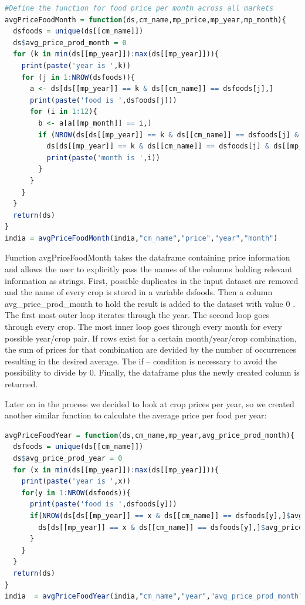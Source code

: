 \documentclass[11pt]{article}
\begin{document}
\begin{lstlisting}[language= R, captionpos=b,caption=\href{https://github.com/jaidikam/sps_ws1718/tree/master/Qfolder1}{SPL\_Q1\_india\_preparation}]
#Define the function for food price per month across all markets
avgPriceFoodMonth = function(ds,cm_name,mp_price,mp_year,mp_month){
  dsfoods = unique(ds[[cm_name]])
  ds$avg_price_prod_month = 0
  for (k in min(ds[[mp_year]]):max(ds[[mp_year]])){
    print(paste('year is ',k))
    for (j in 1:NROW(dsfoods)){
      a <- ds[ds[[mp_year]] == k & ds[[cm_name]] == dsfoods[j],]
      print(paste('food is ',dsfoods[j]))
      for (i in 1:12){
        b <- a[a[[mp_month]] == i,]
        if (NROW(ds[ds[[mp_year]] == k & ds[[cm_name]] == dsfoods[j] & ds[[mp_month]] == i,]$avg_price_prod_month) >0) {
          ds[ds[[mp_year]] == k & ds[[cm_name]] == dsfoods[j] & ds[[mp_month]] == i,]$avg_price_prod_month =  sum(b[[mp_price]])/ NROW(b)
          print(paste('month is ',i))  
        } 
      }
    }
  }
  return(ds)
}
india = avgPriceFoodMonth(india,"cm_name","price","year","month")
\end{lstlisting}

Function avgPriceFoodMonth takes the dataframe containing price information and allows the user to explicitly pass the names of the columns holding relevant information as strings.
First, possible duplicates in the input dataset are removed and the name of every crop is stored in a variable dsfoods. Then a column avg\_price\_prod\_month to hold the result is added to the dataset with value 0 .
The first most outer loop iterates through the year. The second loop goes through every crop. The most inner loop goes through every month for every possible year/crop pair. If rows exist for a certain month/year/crop combination, the sum of prices for that combination are devided by the number of occurrences resulting in the desired average. The if – condition is necessary to avoid the possibility to divide by 0. Finally, the dataframe plus the newly created column is returned.

Later on in the process we decided to look at crop prices per year, so we created another similar function to calculate the average price per food per year:

\begin{lstlisting}[language= R, captionpos=b,caption=\href{https://github.com/jaidikam/sps_ws1718/tree/master/Qfolder2}{SPL\_Q2\_india\_preparation}]
avgPriceFoodYear = function(ds,cm_name,mp_year,avg_price_prod_month){
  dsfoods = unique(ds[[cm_name]]) 
  ds$avg_price_prod_year = 0
  for (x in min(ds[[mp_year]]):max(ds[[mp_year]])){
    print(paste('year is ',x))
    for(y in 1:NROW(dsfoods)){
      print(paste('food is ',dsfoods[y]))
      if(NROW(ds[ds[[mp_year]] == x & ds[[cm_name]] == dsfoods[y],]$avg_price_prod_year) > 0){
        ds[ds[[mp_year]] == x & ds[[cm_name]] == dsfoods[y],]$avg_price_prod_year = sum(ds[ds[[mp_year]] == x & ds[[cm_name]] == dsfoods[y],][[avg_price_prod_month]]) / NROW(ds[ds[[mp_year]] == x & ds[[cm_name]] == dsfoods[y],][[avg_price_prod_month]])
      }
    }
  }
  return(ds)
}
india  = avgPriceFoodYear(india,"cm_name","year","avg_price_prod_month")
\end{lstlisting}
\end{document}
